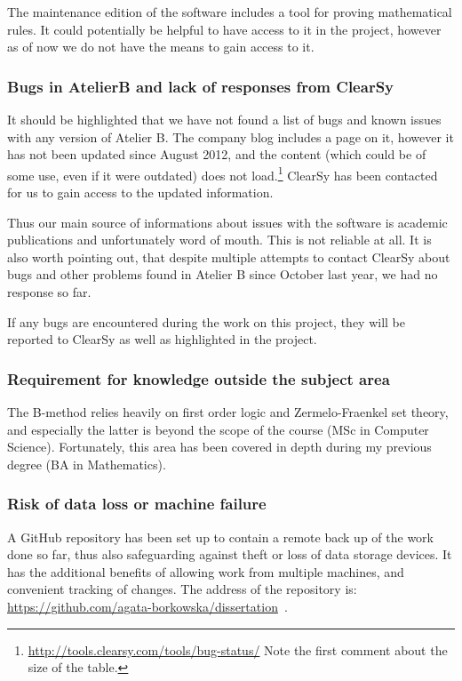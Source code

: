 \documentclass[11pt,journal]{IEEEtran}
\begin{document}
	The maintenance edition of the software includes a tool for proving mathematical rules. It could potentially be helpful to have access to it in the project, however as of now we do not have the means to gain access to it.
	
	\subsubsection{Bugs in AtelierB and lack of responses from ClearSy}
	It should be highlighted that we have not found a list of bugs and known issues with any version of Atelier B. The company blog includes a page on it, however it has not been updated since August 2012, and the content (which could be of some use, even if it were outdated) does not load.\footnote{\url{http://tools.clearsy.com/tools/bug-status/} Note the first comment about the size of the table.} ClearSy has been contacted for us to gain access to the updated information.
	
	Thus our main source of informations about issues with the software is academic publications and unfortunately word of mouth. This is not reliable at all. It is also worth pointing out, that despite multiple attempts to contact ClearSy about bugs and other problems found in Atelier B since October last year, we had no response so far.
	
	If any bugs are encountered during the work on this project, they will be reported to ClearSy as well as highlighted in the project. 
	
	\subsubsection{Requirement for knowledge outside the subject area}
	The B-method relies heavily on first order logic and Zermelo-Fraenkel set theory, and especially the latter is beyond the scope of the course (MSc in Computer Science). Fortunately, this area has been covered in depth during my previous degree (BA in Mathematics).
	
	\subsubsection{Risk of data loss or machine failure}
	A GitHub repository has been set up to contain a remote back up of the work done so far, thus also safeguarding against theft or loss of data storage devices. It has the additional benefits of allowing work from multiple machines, and convenient tracking of changes. The address of the repository is: \url{https://github.com/agata-borkowska/dissertation}~.
	
\end{document}
